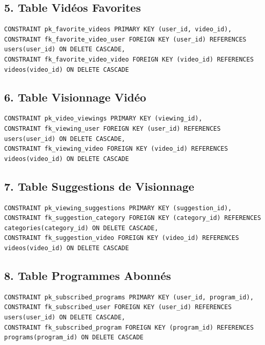 \documentclass[a4paper, 12pt]{article}
\begin{document}
\subsection*{5. Table Vidéos Favorites}

\begin{lstlisting}
CONSTRAINT pk_favorite_videos PRIMARY KEY (user_id, video_id),
CONSTRAINT fk_favorite_video_user FOREIGN KEY (user_id) REFERENCES users(user_id) ON DELETE CASCADE,
CONSTRAINT fk_favorite_video_video FOREIGN KEY (video_id) REFERENCES videos(video_id) ON DELETE CASCADE
\end{lstlisting}

\subsection*{6. Table Visionnage Vidéo}

\begin{lstlisting}
CONSTRAINT pk_video_viewings PRIMARY KEY (viewing_id),
CONSTRAINT fk_viewing_user FOREIGN KEY (user_id) REFERENCES users(user_id) ON DELETE CASCADE,
CONSTRAINT fk_viewing_video FOREIGN KEY (video_id) REFERENCES videos(video_id) ON DELETE CASCADE
\end{lstlisting}

\subsection*{7. Table Suggestions de Visionnage}

\begin{lstlisting}
CONSTRAINT pk_viewing_suggestions PRIMARY KEY (suggestion_id),
CONSTRAINT fk_suggestion_category FOREIGN KEY (category_id) REFERENCES categories(category_id) ON DELETE CASCADE,
CONSTRAINT fk_suggestion_video FOREIGN KEY (video_id) REFERENCES videos(video_id) ON DELETE CASCADE
\end{lstlisting}

\subsection*{8. Table Programmes Abonnés}

\begin{lstlisting}
CONSTRAINT pk_subscribed_programs PRIMARY KEY (user_id, program_id),
CONSTRAINT fk_subscribed_user FOREIGN KEY (user_id) REFERENCES users(user_id) ON DELETE CASCADE,
CONSTRAINT fk_subscribed_program FOREIGN KEY (program_id) REFERENCES programs(program_id) ON DELETE CASCADE
\end{lstlisting}
\end{document}
